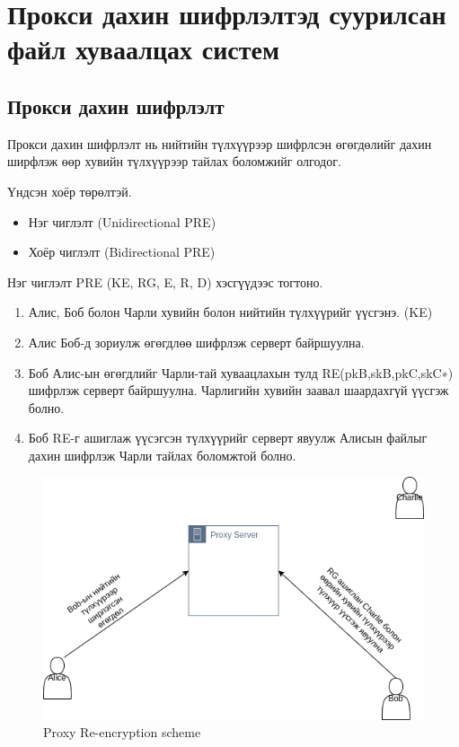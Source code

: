 
\chapter{Прокси дахин шифрлэлтэд суурилсан файл хуваалцах систем} %
\label{Chapter2} %
\pagecolor{white}

\section{Прокси дахин шифрлэлт}

Прокси дахин шифрлэлт нь нийтийн түлхүүрээр шифрлсэн өгөгдөлийг дахин ширфлэж өөр хувийн түлхүүрээр тайлах боломжийг олгодог.

Үндсэн хоёр төрөлтэй.
\begin{itemize}
    \item Нэг чиглэлт (Unidirectional PRE)
    \item Хоёр чиглэлт (Bidirectional PRE)
\end{itemize}

Нэг чиглэлт PRE (KE, RG, E, R, D) хэсгүүдээс тогтоно.

\begin{enumerate}
    \item Алис, Боб болон Чарли хувийн болон нийтийн түлхүүрийг үүсгэнэ. (KE)
    \item Алис Боб-д зориулж өгөгдлөө шифрлэж серверт байршуулна.
    \item Боб Алис-ын өгөгдлийг Чарли-тай хуваацлахын тулд RE(pkB,skB,pkC,skC∗) шифрлэж серверт байршуулна. Чарлигийн хувийн заавал шаардахгүй үүсгэж болно.
    \item Боб RE-г ашиглаж үүсэгсэн түлхүүрийг серверт явуулж Алисын файлыг дахин шифрлэж Чарли тайлах боломжтой болно.
\end{enumerate}

\begin{figure}[ht]
\centering
\includegraphics[scale=0.5]{Figures/pre}
\caption[Proxy Re-encryption scheme]{Proxy Re-encryption scheme}
\label{fig:PRE_Scheme}
\end{figure}


